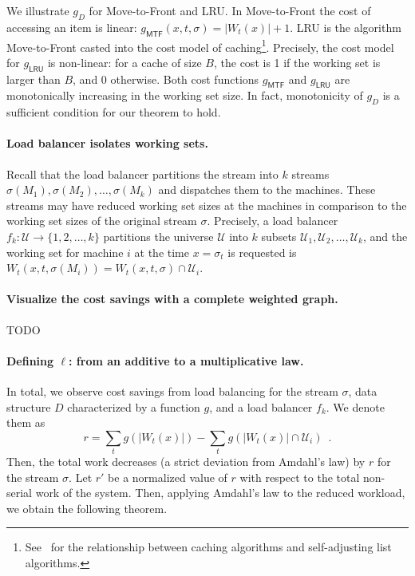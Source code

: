 We illustrate $g_D$ for Move-to-Front and LRU. In Move-to-Front the cost of accessing an item is linear: $g_\textsf{MTF}(x,t,\sigma) = |W_t(x)| + 1$.  LRU is the algorithm Move-to-Front casted into the cost model of caching\footnote{See~\cite{SleatorT85} for the relationship between caching algorithms and self-adjusting list algorithms.}. Precisely, the cost model for $g_\textsf{LRU}$ is non-linear: for a cache of size $B$, the cost is 1 if the working set is larger than $B$, and 0 otherwise. Both cost functions $g_\textsf{MTF}$ and $g_\textsf{LRU}$ are monotonically increasing in the working set size. In fact, monotonicity of $g_D$ is a sufficient condition for our theorem to hold.

\paragraph*{Load balancer isolates working sets.}
Recall that the load balancer partitions the stream into $k$ streams $\sigma(M_1), \sigma(M_2), \ldots, \sigma(M_k)$ and dispatches them to the machines.
These streams may have reduced working set sizes at the machines in comparison to the working set sizes of the original stream $\sigma$.
Precisely, a load balancer $f_k : \mathcal{U} \to \{1, 2, \ldots, k\}$ partitions the universe $\mathcal{U}$ into $k$ subsets $\mathcal{U}_1, \mathcal{U}_2, \ldots, \mathcal{U}_k$, and the working set for machine $i$ at the time $x = \sigma_t$ is requested is $W_t(x, t, \sigma(M_i)) = W_t(x, t, \sigma) \cap \mathcal{U}_i$.

\paragraph*{Visualize the cost savings with a complete weighted graph.}
TODO

\paragraph*{Defining $\ell$: from an additive to a multiplicative law.}
In total, we observe cost savings from load balancing for the stream $\sigma$, data structure $D$ characterized by a function $g$, and a load balancer $f_k$. We denote them as
\[
	r = \sum_{t} g(|W_t(x)|) - \sum_{t} g(|W_t(x)| \cap \mathcal{U}_i) \enspace .
\]
Then, the total work decreases (a strict deviation from Amdahl's law) by $r$ for the stream $\sigma$. Let $r'$ be a normalized value of $r$ with respect to the total non-serial work of the system. Then, applying Amdahl's law to the reduced workload, we obtain the following theorem.


